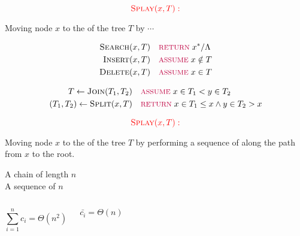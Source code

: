 \begin{frame}{}
  \begin{center}
    \[
      \textcolor{red}{\textsc{Splay}(x, T):}
    \]

    Moving node $x$ to the  of the tree $T$ by $\cdots$
  \end{center}

  \pause
  \vspace{-0.50cm}
  \begin{align*}
    \textsc{Search}(x, T) & \quad \textcolor{purple}{\text{\footnotesize RETURN }} x^{\ast}/\Lambda \\
    \textsc{Insert}(x, T) & \quad \textcolor{purple}{\text{\footnotesize ASSUME }} x \notin T \\
    \textsc{Delete}(x, T) & \quad \textcolor{purple}{\text{\footnotesize ASSUME }} x \in T \\
  \end{align*}

  \pause
  \vspace{-0.80cm}
  \begin{align*}
    T \gets \textsc{Join}(T_1, T_2) & \quad \textcolor{purple}{\text{\footnotesize ASSUME }} x \in T_1 < y \in T_2 \\
    (T_1, T_2) \gets \textsc{Split}(x, T) & \quad \textcolor{purple}{\text{\footnotesize RETURN }} x \in T_1 \le x \land y \in T_2 > x
  \end{align*}
\end{frame}

\begin{frame}{}
  \begin{center}
    \[
      \textcolor{red}{\textsc{Splay}(x, T):}
    \]

    Moving node $x$ to the  of the tree $T$ by performing a sequence of 
    along the path from $x$ to the root.
  \end{center}

  \pause
\end{frame}

\begin{frame}{}
  \begin{center}
    A chain of length $n$ \\[8pt]
    A sequence of $n$ \splay{}
  \end{center}

  \begin{columns}
      \pause
      \[
	\sum_{i = 1}^{n} c_i = \Theta(n^2)
      \]

      \[
	\bar{c_i} = \Theta(n)
      \]
  \end{columns}
\end{frame}

